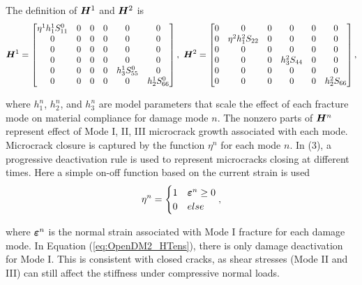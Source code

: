 \documentclass[11pt]{article}
\begin{document}
The definition of \(\bm{H}^1\) and \(\bm{H}^2\) is
\begin{equation}
  \label{eq:OpenDM2_HTens}
  \bm{H}^1 =
  \begin{bmatrix}
    \eta^1 h_1^1 S_{11}^0 & 0 & 0 & 0 & 0 & 0 \\
    0 & 0 & 0 & 0 & 0 & 0 \\
    0 & 0 & 0 & 0 & 0 & 0 \\
    0 & 0 & 0 & 0 & 0 & 0 \\
    0 & 0 & 0 & 0 & h_3^1 S_{55}^0 & 0 \\
    0 & 0 & 0 & 0 & 0 & h_2^1 S_{66}^0 \\
  \end{bmatrix}, \
  \bm{H}^2 =
  \begin{bmatrix}
    0 & 0 & 0 & 0 & 0 & 0 \\
    0 & \eta^2 h_1^2 S_{22} & 0 & 0 & 0 & 0 \\
    0 & 0 & 0 & 0 & 0 & 0 \\
    0 & 0 & 0 & h_3^2 S_{44} & 0 & 0 \\
    0 & 0 & 0 & 0 & 0 & 0 \\
    0 & 0 & 0 & 0 & 0 & h_2^2 S_{66} \\
  \end{bmatrix},
\end{equation}

where \(h_1^n\), \(h_2^n\), and \(h_3^n\) are model parameters that scale
the effect of each fracture mode on material compliance for damage
mode \(n\). The nonzero parts of \(\bm{H}^n\) represent effect of Mode
I, II, III microcrack growth associated with each mode. Microcrack
closure is captured by the function \(\eta^n\) for each mode \(n\). In
(3), a progressive deactivation rule is used to
represent microcracks closing at different times. Here a simple on-off
function based on the current strain is used
\begin{equation}
  \label{eq:DamageDeactivation}
  \eta^n = 
  \begin{cases}
    1 & \bm{\varepsilon}^n \geq 0 \\
    0 & else
  \end{cases},
\end{equation}

where \(\bm{\varepsilon}^n\) is the normal strain associated with Mode I fracture
for each damage mode. In Equation (\ref{eq:OpenDM2_HTens}), there is
only damage deactivation for Mode I. This is consistent with closed
cracks, as shear stresses (Mode II and III) can still affect the
stiffness under compressive normal loads.
\end{document}
